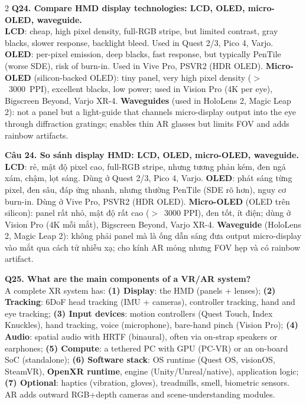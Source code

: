 \begin{paracol}{2}
\textbf{Q24. Compare HMD display technologies: LCD, OLED, micro-OLED, waveguide.}\\
\textbf{LCD}: cheap, high pixel density, full-RGB stripe, but limited contrast, gray blacks, slower response, backlight bleed. Used in Quest 2/3, Pico 4, Varjo. \textbf{OLED}: per-pixel emission, deep blacks, fast response, but typically PenTile (worse SDE), risk of burn-in. Used in Vive Pro, PSVR2 (HDR OLED). \textbf{Micro-OLED} (silicon-backed OLED): tiny panel, very high pixel density ($>$~3000~PPI), excellent blacks, low power; used in Vision Pro (4K per eye), Bigscreen Beyond, Varjo XR-4. \textbf{Waveguides} (used in HoloLens 2, Magic Leap 2): not a panel but a light-guide that channels micro-display output into the eye through diffraction gratings; enables thin AR glasses but limits FOV and adds rainbow artifacts.

\switchcolumn

\textbf{Câu 24. So sánh display HMD: LCD, OLED, micro-OLED, waveguide.}\\
\textbf{LCD}: rẻ, mật độ pixel cao, full-RGB stripe, nhưng tương phản kém, đen ngả xám, chậm, lọt sáng. Dùng ở Quest 2/3, Pico 4, Varjo. \textbf{OLED}: phát sáng từng pixel, đen sâu, đáp ứng nhanh, nhưng thường PenTile (SDE rõ hơn), nguy cơ burn-in. Dùng ở Vive Pro, PSVR2 (HDR OLED). \textbf{Micro-OLED} (OLED trên silicon): panel rất nhỏ, mật độ rất cao ($>$~3000 PPI), đen tốt, ít điện; dùng ở Vision Pro (4K mỗi mắt), Bigscreen Beyond, Varjo XR-4. \textbf{Waveguide} (HoloLens 2, Magic Leap 2): không phải panel mà là ống dẫn sáng đưa output micro-display vào mắt qua cách tử nhiễu xạ; cho kính AR mỏng nhưng FOV hẹp và có rainbow artifact.

\switchcolumn*

\textbf{Q25. What are the main components of a VR/AR system?}\\
A complete XR system has: \textbf{(1) Display}: the HMD (panels + lenses); \textbf{(2) Tracking}: 6DoF head tracking (IMU + cameras), controller tracking, hand and eye tracking; \textbf{(3) Input devices}: motion controllers (Quest Touch, Index Knuckles), hand tracking, voice (microphone), bare-hand pinch (Vision Pro); \textbf{(4) Audio}: spatial audio with HRTF (binaural), often via on-strap speakers or earphones; \textbf{(5) Compute}: a tethered PC with GPU (PC-VR) or an on-board SoC (standalone); \textbf{(6) Software stack}: OS runtime (Quest OS, visionOS, SteamVR), \textbf{OpenXR runtime}, engine (Unity/Unreal/native), application logic; \textbf{(7) Optional}: haptics (vibration, gloves), treadmills, smell, biometric sensors. AR adds outward RGB+depth cameras and scene-understanding modules.


\end{paracol}
